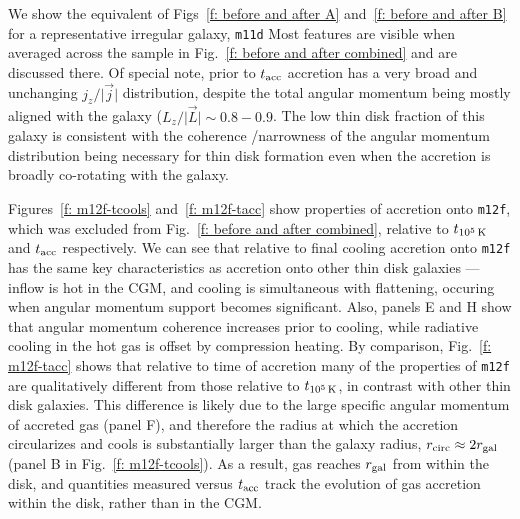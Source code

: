 \documentclass[fleqn,usenatbib]{mnras}
\newcommand{\tcools}{t_{10^5\,{\rm K}}}
\newcommand{\tacc}{t_{\rm acc}}
\newcommand{\Rcirc}[0]{r_{\rm circ}}
\begin{document}
We show the equivalent of Figs~\ref{f: before and after A} and~\ref{f: before and after B} for a representative irregular galaxy, \texttt{m11d}
Most features are visible when averaged across the sample in Fig.~\ref{f: before and after combined} and are discussed there.
Of special note, prior to $\tacc$ accretion has a very broad and unchanging $j_z/\vert \vec j \vert$ distribution, despite the total angular momentum being mostly aligned with the galaxy ($L_z / \vert \vec L \vert \sim 0.8-0.9$.
The low thin disk fraction of this galaxy is consistent with the coherence /narrowness of the angular momentum distribution being necessary for thin disk formation even when the accretion is broadly co-rotating with the galaxy.

Figures~\ref{f: m12f-tcools} and~\ref{f: m12f-tacc} show properties of accretion onto \texttt{m12f}, which was excluded from Fig.~\ref{f: before and after combined}, relative to $\tcools$ and $\tacc$ respectively.
We can see that relative to final cooling accretion onto \texttt{m12f} has the same key characteristics as accretion onto other thin disk galaxies --- inflow is hot in the CGM, and cooling is simultaneous with flattening, occuring when angular momentum support becomes significant.
Also, panels E and H show that angular momentum coherence increases prior to cooling, while radiative cooling in the hot gas is offset by compression heating.
By comparison, Fig.~\ref{f: m12f-tacc} shows that relative to time of accretion many of the properties of \texttt{m12f} are qualitatively different from those relative to $\tcools$, in contrast with other thin disk galaxies.
This difference is likely due to the large specific angular momentum of accreted gas (panel F), and therefore the radius at which the accretion circularizes and cools is substantially larger than the galaxy radius, $\Rcirc \approx 2 r_{\rm gal}$ (panel B in Fig.~\ref{f: m12f-tcools}).
As a result, gas reaches $r_{\rm gal}$ from within the disk, and quantities measured versus $\tacc$ track the evolution of gas accretion within the disk, rather than in the CGM. 
\end{document}
